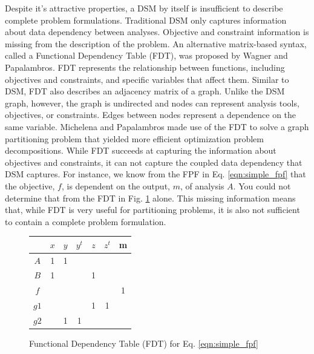     Despite it's attractive properties, a DSM by itself is insufficient to describe complete problem formulations. 
    Traditional DSM only captures information about data dependency between analyses. 
    Objective and constraint information is missing from the description of the problem. 
    An alternative matrix-based syntax, called a Functional Dependency Table (FDT), was proposed by Wagner and Papalambros. 
    FDT represents the relationship between functions, including objectives and constraints, and specific variables that affect 
    them\cite{Wagner1993}. Similar to DSM, FDT also describes an adjacency matrix of a graph. Unlike the DSM graph, 
    however, the graph is undirected and nodes can represent analysis tools, objectives, 
    or constraints. Edges between nodes represent a dependence on the same 
    variable. Michelena and Papalambros made use of the FDT to solve a graph partitioning problem that yielded 
    more efficient optimization problem decompositions\cite{Michelena1997}. While FDT succeeds at capturing the 
    information about objectives and constraints, it can not capture the coupled data dependency that DSM captures. For instance, 
    we know from the FPF in Eq. \ref{eqn:simple_fpf} that the objective, $f$, is dependent on the 
    output, $m$, of analysis $A$. You could not determine that from the FDT in Fig. \ref{fig:FDT_simple} alone. This missing 
    information means that, while FDT is very useful for partitioning problems, it is also not sufficient to contain a 
    complete problem formulation. 

    \begin{figure}
        \begin{center}
        \begin{tabular}{|c|c|c|c|c|c|c|}
            \hline
                 & $x$ & $y$ & $y^t$ & $z$ & $z^t$ & m \\ \hline
            $A$  & 1  & 1    &       &     &       &   \\ \hline
            $B$  & 1  &      &       & 1   &       &   \\ \hline
            $f$  &    &      &       &     &       & 1 \\ \hline
            $g1$ &    &      &       & 1   & 1     &   \\ \hline
            $g2$ &    & 1    & 1     &     &       &   \\
            \hline
        \end{tabular}
        \caption{Functional Dependency Table (FDT) for Eq. \ref{eqn:simple_fpf} \label{fig:FDT_simple}}
        \end{center}
    \end{figure}

